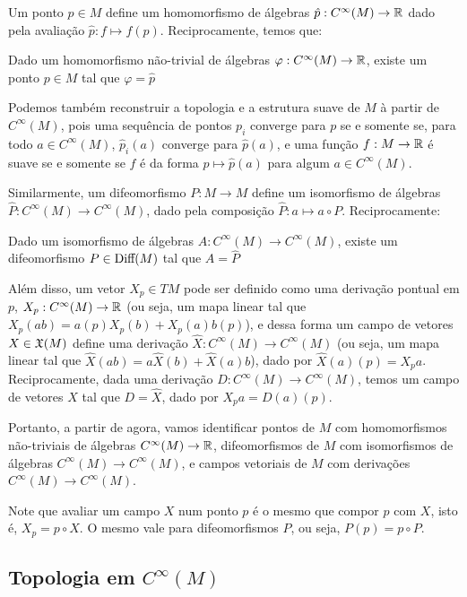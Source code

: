 Um ponto $p \in M$ define um homomorfismo de álgebras
$\hat{p} : C^\infty(M) \to \mathbb{R}$
dado pela avaliação $\hat{p}:f \mapsto f(p)$. Reciprocamente, temos que:

\begin{proposition}
    Dado um homomorfismo não-trivial de álgebras $\varphi: C^\infty(M) \to \mathbb{R}$,
    existe um ponto $p \in M$ tal que $\varphi = \hat{p}$
\end{proposition}

Podemos também reconstruir
a topologia e a estrutura suave de $M$ à partir de $C^\infty(M)$,
pois uma sequência de pontos
$p_i$ converge para $p$ se e somente se,
para todo $a \in C^\infty(M)$, $\hat{p}_i(a)$ converge para $\hat{p}(a)$,
e uma função $f:M \to \mathbb{R}$ é suave se e somente se
$f$ é da forma $p \mapsto \hat{p}(a)$ para algum $a \in C^\infty(M)$.

Similarmente, um difeomorfismo $P: M \to M$ define um isomorfismo
de álgebras $\hat{P} : C^\infty(M) \to C^\infty(M)$, dado pela composição
$\hat{P} : a \mapsto a \circ P$. Reciprocamente:

\begin{proposition}
    Dado um isomorfismo de álgebras $A: C^\infty(M) \to C^\infty(M)$,
    existe um difeomorfismo $P \in \text{Diff}(M)$ tal que $A = \hat{P}$
\end{proposition}

Além disso, um vetor $X_p \in TM$ pode ser definido
como uma derivação pontual em $p$, $X_p: C^\infty(M) \to \mathbb{R}$
(ou seja, um mapa linear
tal que $X_p(ab) = a(p)X_p(b)  + X_p(a)b(p)$),
e dessa forma
um campo de vetores $X \in \mathfrak{X}(M)$ define
uma derivação $\hat{X}: C^\infty(M) \to C^\infty(M)$ (ou seja, um mapa linear
tal que $\hat{X}(ab) = a\hat{X}(b)  + \hat{X}(a)b$), dado por
$\hat{X}(a)(p) = X_p a$. Reciprocamente,
dada uma derivação $D: C^\infty(M) \to C^\infty(M)$, temos um campo
de vetores $X$ tal que $D = \hat{X}$, dado por $X_p a = D(a)(p)$.

Portanto, a partir de agora, vamos identificar pontos de $M$ com homomorfismos
não-triviais
de álgebras $C^\infty(M) \to \mathbb{R}$, difeomorfismos de $M$
com
isomorfismos de álgebras $C^\infty(M) \to C^\infty(M)$,
e campos vetoriais de $M$ com derivações
$C^\infty(M) \to C^\infty(M)$.

Note que avaliar um campo $X$ num ponto $p$
é o mesmo que compor $p$ com $X$, isto é,
$X_p = p \circ X$. O mesmo vale para difeomorfismos
$P$, ou seja, $P(p) = p \circ P$.

\subsection{Topologia em $C^\infty(M)$}

